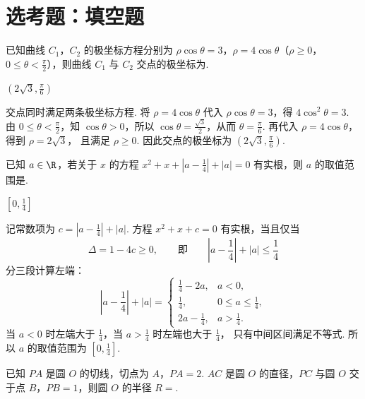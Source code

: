 \section{选考题：填空题}

\begin{problem}
已知曲线 \(C_1\)，\(C_2\) 的极坐标方程分别为 \(\rho \cos \theta = 3\)，\(\rho = 4 \cos \theta\)（\(\rho \geqslant 0\)，\(0 \leqslant \theta < \frac{\pi}{2}\)），则曲线 \(C_1\) 与 \(C_2\) 交点的极坐标为\fillinblank{}.
\end{problem}

\begin{answer}
\(\left(2\sqrt{3},\frac{\pi}{6}\right)\)
\end{answer}

\begin{solution}
交点同时满足两条极坐标方程. 将 \(\rho=4\cos\theta\) 代入
\(\rho\cos\theta=3\)，得 \(4\cos^2\theta=3\).
由 \(0\leqslant\theta<\frac\pi2\)，知 \(\cos\theta>0\)，所以
\(\cos\theta=\frac{\sqrt3}{2}\)，从而 \(\theta=\frac\pi6\).
再代入 \(\rho=4\cos\theta\)，得到 \(\rho=2\sqrt3\)，
且满足 \(\rho\geqslant0\). 因此交点的极坐标为
\(\left(2\sqrt3,\frac\pi6\right)\).
\end{solution}

\begin{problem}
已知 \(a \in \R\)，若关于 \(x\) 的方程 \(x^2 + x + \left| a - \frac{1}{4} \right| + |a| = 0\) 有实根，则 \(a\) 的取值范围是\fillinblank{}.
\end{problem}

\begin{answer}
\(\left[0,\frac{1}{4}\right]\)
\end{answer}

\begin{solution}
记常数项为 \(c=\left|a-\frac14\right|+|a|\). 方程
\(x^2+x+c=0\) 有实根，当且仅当
\[
\Delta=1-4c\geqslant0,
\qquad\text{即}\qquad
\left|a-\frac14\right|+|a|\leqslant\frac14
\]
分三段计算左端：
\[
\left|a-\frac14\right|+|a|=
\begin{cases}
\frac14-2a, & a<0,\\
\frac14, & 0\leqslant a\leqslant\frac14,\\
2a-\frac14, & a>\frac14.
\end{cases}
\]
当 \(a<0\) 时左端大于 \(\frac14\)，当 \(a>\frac14\) 时左端也大于 \(\frac14\)，
只有中间区间满足不等式. 所以 \(a\) 的取值范围为
\(\left[0,\frac14\right]\).
\end{solution}

\begin{problem}
已知 \(PA\) 是圆 \(O\) 的切线，切点为 \(A\)，\(PA = 2\). \(AC\) 是圆 \(O\) 的直径，\(PC\) 与圆 \(O\) 交于点 \(B\)，\(PB = 1\)，则圆 \(O\) 的半径 \(R =\)\fillinblank{}.
\end{problem}

